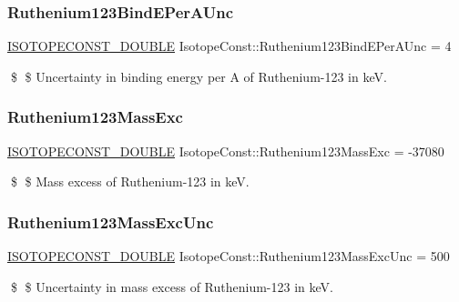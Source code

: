 \subsubsection{\texorpdfstring{Ruthenium123\+Bind\+E\+Per\+A\+Unc}{Ruthenium123BindEPerAUnc}}
{\footnotesize\ttfamily \mbox{\hyperlink{group___isotope_const-_macros_ga8f45a7272ce02c0b4c65c44636ed719a}{I\+S\+O\+T\+O\+P\+E\+C\+O\+N\+S\+T\+\_\+\+D\+O\+U\+B\+LE}} Isotope\+Const\+::\+Ruthenium123\+Bind\+E\+Per\+A\+Unc = 4}

\$ \$ Uncertainty in binding energy per A of Ruthenium-\/123 in keV. \mbox{\label{group___isotope_const-_ruthenium-_ru123_ga4f33f8902af2f5fe60c373e549bb91c2}} 
\subsubsection{\texorpdfstring{Ruthenium123\+Mass\+Exc}{Ruthenium123MassExc}}
{\footnotesize\ttfamily \mbox{\hyperlink{group___isotope_const-_macros_ga8f45a7272ce02c0b4c65c44636ed719a}{I\+S\+O\+T\+O\+P\+E\+C\+O\+N\+S\+T\+\_\+\+D\+O\+U\+B\+LE}} Isotope\+Const\+::\+Ruthenium123\+Mass\+Exc = -\/37080}

\$ \$ Mass excess of Ruthenium-\/123 in keV. \mbox{\label{group___isotope_const-_ruthenium-_ru123_ga67358aeaf44cf215e24e3c6438c0e787}} 
\subsubsection{\texorpdfstring{Ruthenium123\+Mass\+Exc\+Unc}{Ruthenium123MassExcUnc}}
{\footnotesize\ttfamily \mbox{\hyperlink{group___isotope_const-_macros_ga8f45a7272ce02c0b4c65c44636ed719a}{I\+S\+O\+T\+O\+P\+E\+C\+O\+N\+S\+T\+\_\+\+D\+O\+U\+B\+LE}} Isotope\+Const\+::\+Ruthenium123\+Mass\+Exc\+Unc = 500}

\$ \$ Uncertainty in mass excess of Ruthenium-\/123 in keV. \mbox{\label{group___isotope_const-_ruthenium-_ru123_ga8ba076750e2d9471b3b7532e889312af}} 
